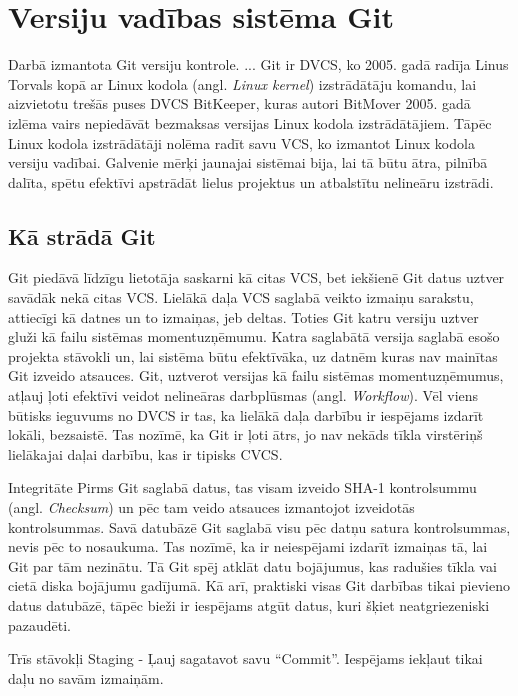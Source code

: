 \section{Versiju vadības sistēma Git}
Darbā izmantota Git versiju kontrole. ... %
Git ir DVCS, ko 2005. gadā radīja Linus Torvals kopā ar Linux kodola (angl. \textit{Linux kernel}) izstrādātāju komandu, lai aizvietotu trešās puses DVCS BitKeeper, kuras autori BitMover 2005. gadā izlēma vairs nepiedāvāt bezmaksas versijas Linux kodola izstrādātājiem. Tāpēc Linux kodola izstrādātāji nolēma radīt savu VCS, ko izmantot Linux kodola versiju vadībai. Galvenie mērķi jaunajai sistēmai bija, lai tā būtu ātra, pilnībā dalīta, spētu efektīvi apstrādāt lielus projektus un atbalstītu nelineāru izstrādi.

\subsection{Kā strādā Git}
Git piedāvā līdzīgu lietotāja saskarni kā citas VCS, bet iekšienē Git datus uztver savādāk nekā citas VCS. Lielākā daļa VCS saglabā veikto izmaiņu sarakstu, attiecīgi kā datnes un to izmaiņas, jeb deltas.
Toties Git katru versiju uztver gluži kā failu sistēmas momentuzņēmumu. Katra saglabātā versija saglabā esošo projekta stāvokli un, lai sistēma būtu efektīvāka, uz datnēm kuras nav mainītas Git izveido atsauces. Git, uztverot versijas kā failu sistēmas momentuzņēmumus, atļauj ļoti efektīvi veidot nelineāras darbplūsmas (angl. \textit{Workflow}).
Vēl viens būtisks ieguvums no DVCS ir tas, ka lielākā daļa darbību ir iespējams izdarīt lokāli, bezsaistē. Tas nozīmē, ka Git ir ļoti ātrs, jo nav nekāds tīkla virstēriņš lielākajai daļai darbību, kas ir tipisks CVCS.

Integritāte
Pirms Git saglabā datus, tas visam izveido SHA-1 kontrolsummu (angl. \textit{Checksum}) un pēc tam veido atsauces izmantojot izveidotās kontrolsummas. Savā datubāzē Git saglabā visu pēc datņu satura kontrolsummas, nevis pēc to nosaukuma. Tas nozīmē, ka ir neiespējami izdarīt izmaiņas tā, lai Git par tām nezinātu. Tā Git spēj atklāt datu bojājumus, kas radušies tīkla vai cietā diska bojājumu gadījumā. Kā arī, praktiski visas Git darbības tikai pievieno datus datubāzē, tāpēc bieži ir iespējams atgūt datus, kuri šķiet neatgriezeniski pazaudēti.

Trīs stāvokļi
Staging - Ļauj sagatavot savu ``Commit''. Iespējams iekļaut tikai daļu no savām izmaiņām.


